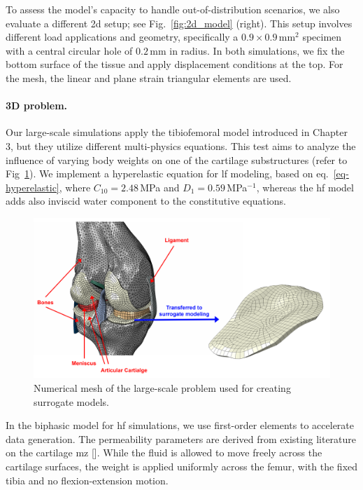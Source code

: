 \documentclass[12pt,a4paper]{report}
\begin{document}
To assess the model's capacity to handle out-of-distribution scenarios, we also evaluate a different \ac{2d} setup; see Fig.~\ref{fig:2d_model} (right). This setup involves different load applications and geometry, specifically a $0.9 \times 0.9$\,mm$^2$ specimen with a central circular hole of $0.2$\,mm in radius. In both simulations, we fix the bottom surface of the tissue and apply displacement conditions at the top. For the mesh, the linear and plane strain triangular elements are used.

\paragraph{3D problem.} Our large-scale simulations apply the tibiofemoral model introduced in Chapter 3, but they utilize different multi-physics equations. This test aims to analyze the influence of varying body weights on one of the cartilage substructures (refer to Fig~\ref{fig:3d_model}). We implement a hyperelastic equation for \ac{lf} modeling, based on eq.~\ref{eq-hyperelastic}, where $C_{10} = 2.48$\,MPa and $D_1 = 0.59$\,MPa$^{-1}$, whereas the \ac{hf} model adds also inviscid water component to the constitutive equations.
%
\begin{figure}\centering
\includegraphics[width=\linewidth]{3D_model.png}
\caption{Numerical mesh of the large-scale problem used for creating surrogate models.\label{fig:3d_model}}
\end{figure}

In the biphasic model for \ac{hf} simulations, we use first-order elements to accelerate data generation. The permeability parameters are derived from existing literature on the cartilage \ac{mz} [\cite{sajjadinia2019,stender2016}]. While the fluid is allowed to move freely across the cartilage surfaces, the weight is applied uniformly across the femur, with the fixed tibia and no flexion-extension motion.
\end{document}
